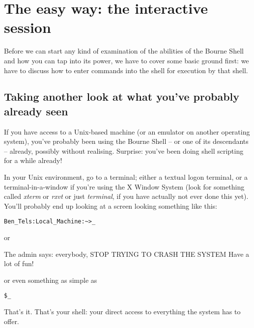 \section{The easy way: the interactive session}
Before we can start any kind of examination of the abilities of the Bourne
Shell and how you can tap into its power, we have to cover some basic ground
first: we have to discuss how to enter commands into the shell for execution by
that shell.

\subsection{Taking another look at what you've probably already seen}
If you have access to a Unix-based machine (or an emulator on another operating
system), you've probably been using the Bourne Shell -- or one of its
descendants -- already, possibly without realising. Surprise: you've been doing
shell scripting for a while already!

In your Unix environment, go to a terminal; either a textual logon terminal, or
a terminal-in-a-window if you're using the X Window System (look for something
called \textit{xterm} or \textit{rxvt} or just \textit{terminal}, if you have
actually not ever done this yet). You'll probably end up looking at a screen
looking something like this:
\scriptsize
\begin{verbatim}
Ben_Tels:Local_Machine:~>_
\end{verbatim}
\normalsize
or
 
The admin says: everybody, STOP TRYING TO CRASH THE SYSTEM Have a lot of fun!

or even something as simple as
\scriptsize
\begin{verbatim}
$_
\end{verbatim}
\normalsize

That's it. That's your shell: your direct access to everything the system has
to offer.

